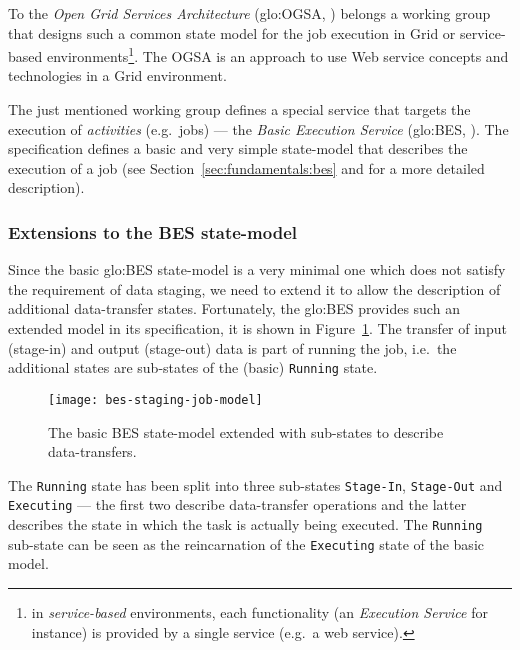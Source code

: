 To   the   \emph{Open   Grid   Services   Architecture}   (\gls{glo:OGSA},
\cite{ogsa})  belongs a  working group  that designs  such a  common state
model    for    the   job    execution    in    Grid   or    service-based
environments\footnote{in     \emph{service-based}    environments,    each
  functionality (an \emph{Execution Service}  for instance) is provided by
  a single service (e.g.~a web service).}.  The OGSA is an approach to use
Web service concepts and technologies in a Grid environment.

The just  mentioned working group  defines a special service  that targets
the  execution  of   \emph{activities}  (e.g.~jobs)  ---  the  \emph{Basic
  Execution Service}  (\gls{glo:BES}, \cite{ogsa-bes}).  The specification
defines a basic  and very simple state-model that  describes the execution
of a job (see Section~\ref{sec:fundamentals:bes} and \cite{ogsa-bes} for a
more detailed description).

\subsubsection{Extensions to the BES state-model}

Since the basic \gls{glo:BES} state-model is a very minimal one which does
not satisfy the requirement of data staging, we need to extend it to allow
the  description  of additional  data-transfer  states.  Fortunately,  the
\gls{glo:BES} provides such an extended  model in its specification, it is
shown in  Figure~\ref{fig:bes-extended}. The transfer  of input (stage-in)
and  output  (stage-out)  data  is  part  of  running  the  job,  i.e.~the
additional states are sub-states of the (basic) \texttt{Running} state.

\begin{figure}
  \centering
  \texttt{[image: bes-staging-job-model]}
  \caption[BES State Model Staging Extension]{The basic BES state-model
    extended with sub-states to describe data-transfers.}
  \label{fig:bes-extended}
\end{figure}

The  \texttt{Running}   state  has   been  split  into   three  sub-states
\texttt{Stage-In}, \texttt{Stage-Out} and \texttt{Executing} --- the first
two describe  data-transfer operations and the latter  describes the state
in  which  the task  is  actually  being  executed.  The  \texttt{Running}
sub-state can be seen as the reincarnation of the \texttt{Executing} state
of the  basic model.

